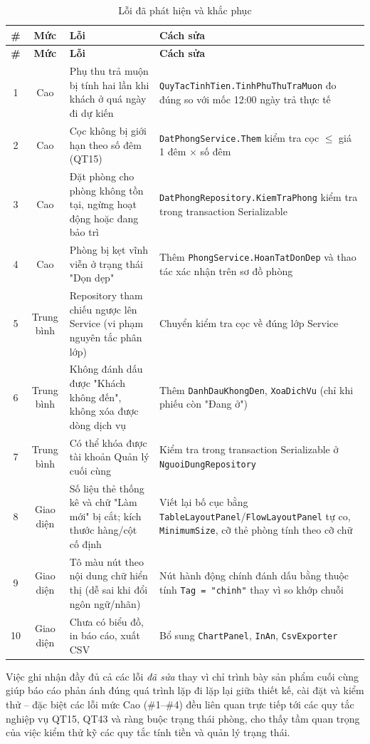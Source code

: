 \documentclass[14pt]{report}
\begin{document}
\begin{longtable}{|c|c|p{4cm}|p{5.7cm}|}
\caption{Lỗi đã phát hiện và khắc phục}\label{tab:loi-da-sua}\\
\hline
\textbf{\#} & \textbf{Mức} & \textbf{Lỗi} & \textbf{Cách sửa}\\\hline
\endfirsthead
\hline \textbf{\#} & \textbf{Mức} & \textbf{Lỗi} & \textbf{Cách sửa}\\\hline
\endhead
1 & Cao & Phụ thu trả muộn bị tính hai lần khi khách ở quá ngày đi dự kiến & \texttt{QuyTacTinhTien.TinhPhuThuTraMuon} đo đúng so với mốc 12:00 ngày trả thực tế \\\hline
2 & Cao & Cọc không bị giới hạn theo số đêm (QT15) & \texttt{DatPhongService.Them} kiểm tra cọc $\le$ giá 1 đêm $\times$ số đêm \\\hline
3 & Cao & Đặt phòng cho phòng không tồn tại, ngừng hoạt động hoặc đang bảo trì & \texttt{DatPhongRepository.KiemTraPhong} kiểm tra trong transaction Serializable \\\hline
4 & Cao & Phòng bị kẹt vĩnh viễn ở trạng thái "Dọn dẹp" & Thêm \texttt{PhongService.HoanTatDonDep} và thao tác xác nhận trên sơ đồ phòng \\\hline
5 & Trung bình & Repository tham chiếu ngược lên Service (vi phạm nguyên tắc phân lớp) & Chuyển kiểm tra cọc về đúng lớp Service \\\hline
6 & Trung bình & Không đánh dấu được "Khách không đến", không xóa được dòng dịch vụ & Thêm \texttt{DanhDauKhongDen}, \texttt{XoaDichVu} (chỉ khi phiếu còn "Đang ở") \\\hline
7 & Trung bình & Có thể khóa được tài khoản Quản lý cuối cùng & Kiểm tra trong transaction Serializable ở \texttt{NguoiDungRepository} \\\hline
8 & Giao diện & Số liệu thẻ thống kê và chữ "Làm mới" bị cắt; kích thước hàng/cột cố định & Viết lại bố cục bằng \texttt{TableLayoutPanel}/\texttt{FlowLayoutPanel} tự co, \texttt{MinimumSize}, cỡ thẻ phòng tính theo cỡ chữ \\\hline
9 & Giao diện & Tô màu nút theo nội dung chữ hiển thị (dễ sai khi đổi ngôn ngữ/nhãn) & Nút hành động chính đánh dấu bằng thuộc tính \texttt{Tag = "chinh"} thay vì so khớp chuỗi \\\hline
10 & Giao diện & Chưa có biểu đồ, in báo cáo, xuất CSV & Bổ sung \texttt{ChartPanel}, \texttt{InAn}, \texttt{CsvExporter} \\\hline
\end{longtable}

Việc ghi nhận đầy đủ cả các lỗi \emph{đã sửa} thay vì chỉ trình bày sản phẩm cuối cùng giúp báo cáo phản ánh đúng quá trình lặp đi lặp lại giữa thiết kế, cài đặt và kiểm thử -- đặc biệt các lỗi mức Cao (\#1--\#4) đều liên quan trực tiếp tới các quy tắc nghiệp vụ QT15, QT43 và ràng buộc trạng thái phòng, cho thấy tầm quan trọng của việc kiểm thử kỹ các quy tắc tính tiền và quản lý trạng thái.
\end{document}
